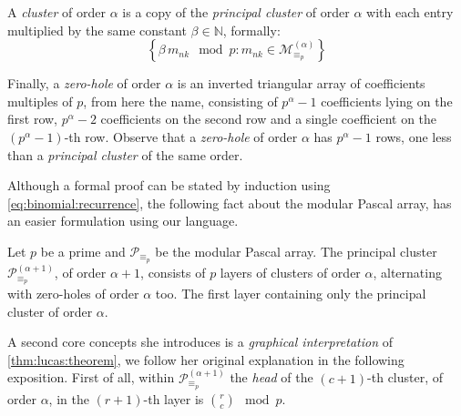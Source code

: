A \emph{cluster} of order $\alpha$ is a copy of the \emph{principal cluster}
of order $\alpha$ with each entry multiplied 
by the same constant $\beta\in\mathbb{N}$, formally:
\begin{displaymath}
    \left\lbrace \beta\,m_{nk}\mod p:m_{nk}\in \mathcal{M}_{\equiv_{p}}^{(\alpha)}\right\rbrace
\end{displaymath}

Finally, a \emph{zero-hole} of order $\alpha$ is an inverted triangular array of
coefficients multiples of $p$, from here the name, consisting of $p^{\alpha}-1$
coefficients lying on the first row, $p^{\alpha}-2$ coefficients on the second row
and a single coefficient on the $(p^{\alpha}-1)$-th row. 
Observe that a \emph{zero-hole} of order $\alpha$ has $p^{\alpha}-1$ rows, one less
than a \emph{principal cluster} of the same order.

Although a formal proof can be stated by induction using \autoref{eq:binomial:recurrence},
the following fact about the modular Pascal array, has an easier formulation
using our language.

\begin{theorem}
    Let $p$ be a prime and $\mathcal{P}_{\equiv_{p}}$ be the 
    modular Pascal array. The principal cluster $\mathcal{P}_{\equiv_{p}}^{(\alpha+1)}$,
    of order $\alpha + 1$, consists of $p$ layers of clusters of order $\alpha$, alternating
    with zero-holes of order $\alpha$ too. The first layer containing only the principal
    cluster of order $\alpha$.
\end{theorem}

A second core concepts she introduces is a \emph{graphical interpretation} of
\autoref{thm:lucas:theorem}, we follow her original explanation in the
following exposition.  First of all, within
$\mathcal{P}_{\equiv_{p}}^{(\alpha+1)}$ the \emph{head} of the $(c+1)$-th cluster,
of order $\alpha$, in the $(r+1)$-th layer is ${{r}\choose{c}}\mod p$.

